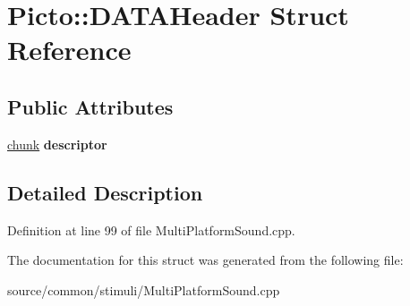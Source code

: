 \hypertarget{struct_picto_1_1_d_a_t_a_header}{\section{Picto\-:\-:D\-A\-T\-A\-Header Struct Reference}
\label{struct_picto_1_1_d_a_t_a_header}
}
\subsection*{Public Attributes}
\begin{DoxyCompactItemize}
\item 
\hypertarget{struct_picto_1_1_d_a_t_a_header_a53bbbcf871aeb4dbb41aa44cb7483196}{\hyperlink{struct_picto_1_1chunk}{chunk} {\bfseries descriptor}}\label{struct_picto_1_1_d_a_t_a_header_a53bbbcf871aeb4dbb41aa44cb7483196}

\end{DoxyCompactItemize}


\subsection{Detailed Description}


Definition at line 99 of file Multi\-Platform\-Sound.\-cpp.



The documentation for this struct was generated from the following file\-:\begin{DoxyCompactItemize}
\item 
source/common/stimuli/Multi\-Platform\-Sound.\-cpp\end{DoxyCompactItemize}
